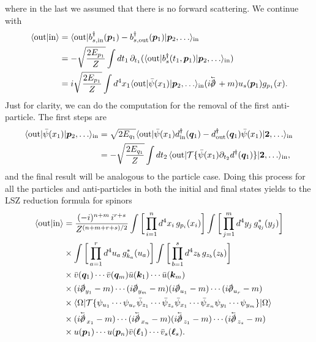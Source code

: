 where in the last we assumed that there is no forward scattering. We continue with
\begin{equation}
    \begin{split}
        \mybraket{\rem{out}}{\rem{in}} &= \mybrakett{\rem{out}}{b^\dg_{s,\rem{in}}(\v{p}_1) - b^\dg_{s,\rem{out}}(\v{p}_1)}{\v{p}_2,\dots}_{\rem{in}} \\
        &= -\sqrt{\frac{2E_{p_1}}{Z}}\int dt_1\,\p_{t_1}(\mybrakett{\rem{out}}{b^\dg_{s}(t_1,\v{p}_1)}{\v{p}_2,\dots}_{\rem{in}}) \\
        &= i\sqrt{\frac{2E_{p_1}}{Z}}\int d^4x_1\mybrakett{\rem{out}}{\b{\psi}(x_1)}{\v{p}_2,\dots}_{\rem{in}}(i\backv{\sl{\p}} + m)u_s(\v{p}_1)g_{p_1}(x).
    \end{split}
\end{equation}
Just for clarity, we can do the computation for the removal of the first anti-particle. The first steps are  
\begin{equation}
    \begin{split}
        \mybrakett{\rem{out}}{\b{\psi}(x_1)}{\v{p}_2,\dots}_{\rem{in}} &= \sqrt{2E_{q_1}}\mybrakett{\rem{out}}{\b{\psi}(x_1)d^\dg_{\rem{in}}(\v{q}_1) - d^\dg_{\rem{out}}(\v{q}_1)\b{\psi}(x_1)}{\v{2},\dots}_{\rem{in}} \\
        &= -\sqrt{\frac{2E_{q_1}}{Z}}\int dt_2\,\mybrakett{\rem{out}}{\TO{\b{\psi}(x_1)\p_{t_2}d^\dg(\v{q}_1)}}{\v{2},\dots}_{\rem{in}},
    \end{split}
\end{equation}
and the final result will be analogous to the particle case. Doing this process for all the particles and anti-particles in both the initial and final states yields to the LSZ reduction formula for spinors
\begin{equation}
\label{eq: LSZ reduction formula for spinors}
    \begin{split}
        \mybraket{\rem{out}}{\rem{in}} &= \frac{(-i)^{n+m}\,i^{r + s}}{Z^{(n + m + r + s)/2}}\int\bigg[\prod_{i=1}^n d^4x_i\,g_{p_i}(x_i)\bigg]\int\bigg[\prod_{j=1}^m d^4y_j\,g^*_{q_j}(y_j)\bigg] \\
        &\times \int\bigg[\prod_{a=1}^r d^4u_a\,g^*_{k_a}(u_a)\bigg]\int\bigg[\prod_{b=1}^s d^4z_b\,g_{z_b}(z_b)\bigg] \\
        &\times \b{v}(\v{q}_1)\cdots\b{v}(\v{q}_m)\b{u}(\v{k}_1)\cdots\b{u}(\v{k}_m) \\
        &\times (i\sl{\p}_{y_1} - m)\cdots(i\sl{\p}_{y_m} - m)(i\sl{\p}_{u_1} - m)\cdots(i\sl{\p}_{u_r} - m) \\
        &\times \mybrakett{\Omega}{\TO{\psi_{u_1}\cdots\psi_{u_r}\b{\psi}_{z_1}\cdots\b{\psi}_{z_s}\b{\psi}_{x_1}\cdots\b{\psi}_{x_n}\psi_{y_1}\cdots\psi_{y_m}}}{\Omega} \\
        &\times (i\backv{\sl{\p}}_{x_1} - m)\cdots(i\backv{\sl{\p}}_{x_n} - m)(i\backv{\sl{\p}}_{z_1} - m)\cdots(i\backv{\sl{\p}}_{z_s} - m) \\
        &\times u(\v{p}_1)\cdots u(\v{p}_n)\b{v}(\v{\ell}_1)\cdots\b{v}_s(\v{\ell}_s).
    \end{split}
\end{equation}
